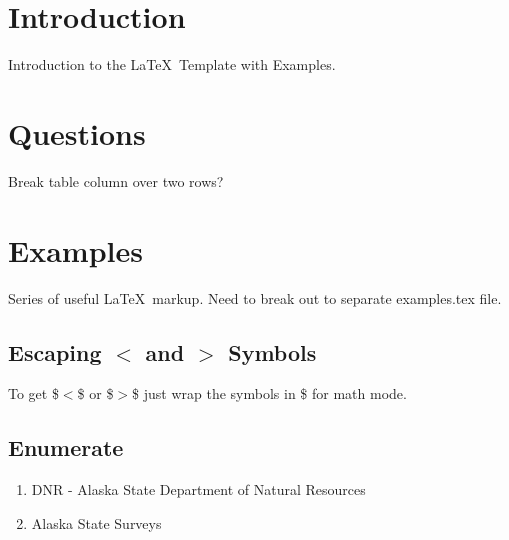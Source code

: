 \documentclass[12pt,letterpaper,dvips]{article}
\newcommand{\FIXME}[1]{\textsf{[FIXME: #1]}}
\newenvironment{itemize*}%
  {\begin{itemize}%
    \setlength{\itemsep}{0pt}%
    \setlength{\parsep}{0pt}}%
  {\end{itemize}}
\begin{document}
\newpage
\section{Introduction}
Introduction to the \LaTeX\ Template with Examples.


\section{Questions}
\begin{itemize*}
     \item{} Break table column over two rows?
\end{itemize*}



\newpage
\section{Examples}
Series of useful \LaTeX\ markup. Need to break out to 
separate examples.tex file.

\subsection{Escaping $<$ and $>$ Symbols}
To get \$$<$\$ or \$$>$\$ just wrap the symbols in \$ for math mode.

\subsection{Enumerate}
\begin{enumerate}
  \item{DNR} - Alaska State Department of Natural Resources

  \item{Alaska State Surveys}
\end{enumerate}
\end{document}
